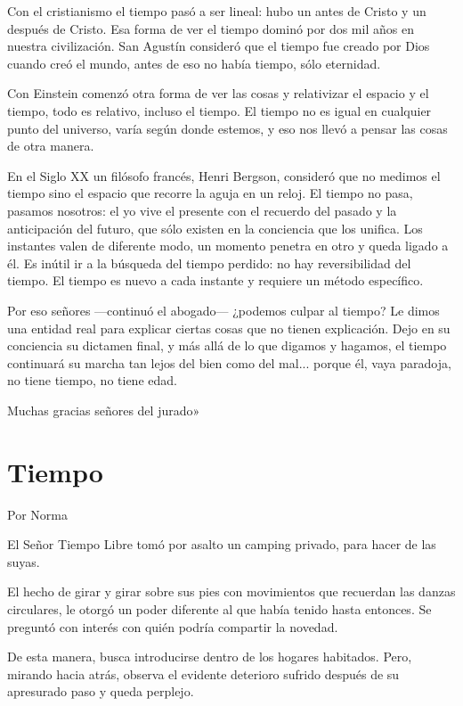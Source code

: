 \documentclass[11pt,twoside,openright,a5paper]{book}
\begin{document}
Con el cristianismo el tiempo pasó a ser lineal: hubo un antes de Cristo y un después de Cristo. Esa forma de ver el tiempo dominó por dos mil años en nuestra civilización. San Agustín consideró que el tiempo fue creado por Dios cuando creó el mundo, antes de eso no había tiempo, sólo eternidad.

Con Einstein comenzó otra forma de ver las cosas y relativizar el espacio y el tiempo, todo es relativo, incluso el tiempo. El tiempo no es igual en cualquier punto del universo, varía según donde estemos, y eso nos llevó a pensar las cosas de otra manera. 

En el Siglo XX un filósofo francés, Henri Bergson, consideró que no medimos el tiempo sino el espacio que recorre la aguja en un reloj. El tiempo no pasa, pasamos nosotros: el yo vive el presente con el recuerdo del pasado y la anticipación del futuro, que sólo existen en la conciencia que los unifica. Los instantes valen de diferente modo, un momento penetra en otro y queda ligado a él. Es inútil ir a la búsqueda del tiempo perdido: no hay reversibilidad del tiempo. El tiempo es nuevo a cada instante y requiere un método específico.

Por eso señores ---continuó el abogado--- ¿podemos culpar al tiempo? Le dimos una entidad real para explicar ciertas cosas que no tienen explicación. Dejo en su conciencia su dictamen final, y más allá de lo que digamos y hagamos, el tiempo continuará su marcha tan lejos del bien como del mal... porque él, vaya paradoja, no tiene tiempo, no tiene edad.

Muchas gracias señores del jurado»
\clearpage
\section*{Tiempo}
                                                                                                         \begin{flushright}Por Norma\end{flushright}

El Señor Tiempo Libre tomó por asalto un camping privado, para hacer de las suyas.

El hecho de girar y girar sobre sus pies con movimientos que recuerdan las danzas circulares, le otorgó un poder diferente al que había tenido hasta entonces. Se preguntó con interés con quién podría compartir la novedad.

De esta manera, busca introducirse dentro de los hogares habitados. Pero, mirando hacia atrás, observa el evidente deterioro sufrido después de su apresurado paso y queda perplejo.
\end{document}
